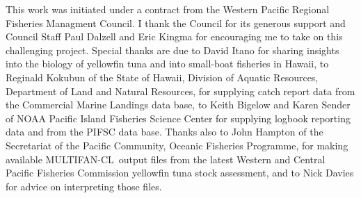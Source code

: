 \documentclass[12pt,letterpaper]{article}
\newcommand\singlespacing{\baselineskip=1.0\normalbaselineskip}
\newcommand\MFCL{MULTIFAN-CL}
\begin{document}

\clearpage
\singlespacing
{}
This work was initiated under a contract from the Western Pacific
Regional Fisheries Managment Council. 
I thank the Council for its generous support and
Council Staff Paul Dalzell and Eric Kingma for encouraging me to
take on this challenging project.
Special thanks are due 
to David Itano for sharing insights into the biology of yellowfin tuna
and into small-boat fisheries in Hawaii,
to Reginald Kokubun of the State of Hawaii, Division of Aquatic Resources,
Department of Land and Natural Resources, for supplying catch report
data from the Commercial Marine Landings data base,
to Keith Bigelow and Karen Sender of NOAA Pacific
Island Fisheries Science Center for supplying logbook reporting data and
from the PIFSC data base.
Thanks also to John Hampton of the Secretariat of the Pacific
Community, Oceanic Fisheries Programme, for making available \MFCL\
output files from the latest Western and Central Pacific
Fisheries Commission yellowfin tuna stock assessment, and to Nick
Davies for advice on interpreting those files.
\end{document}
